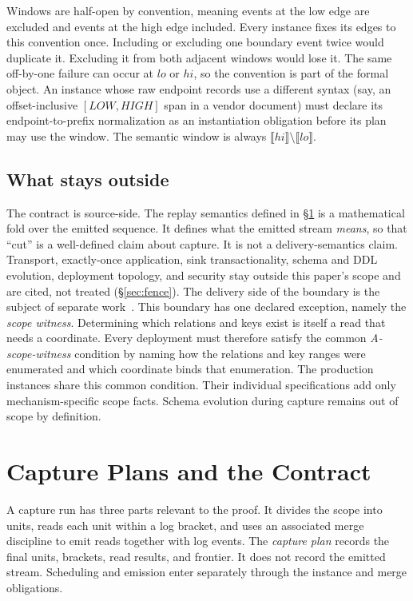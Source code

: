 \documentclass[sigconf,nonacm,10pt]{acmart}
\theoremstyle{plain}
\theoremstyle{definition}
\newcommand{\den}[1]{\llbracket #1 \rrbracket}   %
\begin{document}
Windows are half-open by convention, meaning events at the low edge are
excluded and events at the high edge included. Every instance fixes its
edges to this convention once. Including or excluding one boundary
event twice would duplicate it. Excluding it from both adjacent
windows would lose it. The same off-by-one failure can occur at
$lo$ or $hi$, so the convention is part of the formal object. An
instance whose raw endpoint records use a different syntax (say, an
offset-inclusive $[\mathit{LOW}, \mathit{HIGH}]$ span in a vendor
document) must declare its endpoint-to-prefix normalization as an
instantiation obligation before its plan may use the window. The
semantic window is always $\den{hi} \setminus \den{lo}$.


\subsection{What stays outside}\label{sec:setting-fence}

The contract is source-side. The replay semantics defined in
\S\ref{sec:contract} is a mathematical fold over the emitted
sequence. It defines what the emitted stream \emph{means}, so that
``cut'' is a well-defined claim about capture. It is not a
delivery-semantics claim. Transport, exactly-once application, sink
transactionality, schema and DDL evolution, deployment topology,
and security stay outside this paper's scope and are cited, not
treated (\S\ref{sec:fence}). The delivery side of the boundary is
the subject of separate work~\cite{andreakis2026dualwrite}. This boundary has one declared exception, namely the \emph{scope witness}.
Determining which relations and keys exist is itself a read that
needs a coordinate. Every deployment must therefore satisfy the common
\emph{A-scope-witness} condition by naming how the relations and key ranges
were enumerated and which coordinate binds that enumeration. The
production instances share this common condition. Their individual
specifications add only mechanism-specific scope facts. Schema 
evolution during capture remains out of scope by definition.

\section{Capture Plans and the Contract}\label{sec:contract}

A capture run has three parts relevant to the proof. It divides the
scope into units, reads each unit within a log bracket, and uses an
associated merge discipline to emit reads together with log events.
The \emph{capture plan} records the final units, brackets, read
results, and frontier. It does not record the emitted stream.
Scheduling and emission enter separately through the instance and
merge obligations.
\end{document}
